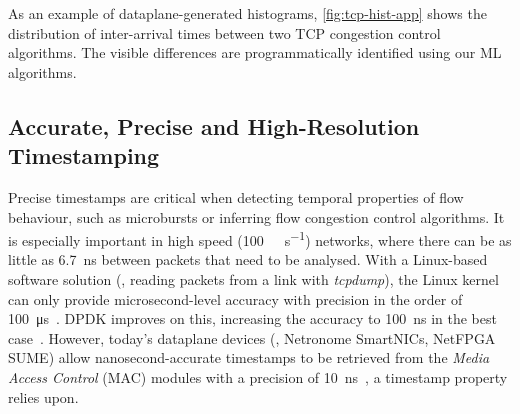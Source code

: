 As an example of dataplane-generated histograms, \cref{fig:tcp-hist-app} shows the distribution of inter-arrival times between two TCP congestion control algorithms. The visible differences are programmatically identified using our ML algorithms.

\subsection{Accurate, Precise and High-Resolution Timestamping}

Precise timestamps are critical when detecting temporal properties of flow behaviour, such as microbursts or inferring flow congestion control algorithms.
It is especially important in high speed (\SI{100}{\giga\bit\per\second}) networks, where there can be as little as \SI{6.7}{\nano\second} between packets that need to be analysed.
With a Linux-based software solution (\eg, reading packets from a link with \emph{tcpdump}), the Linux kernel can only provide microsecond-level accuracy with precision in the order of \SI{100}{\micro\second}~\parencite{DBLP:conf/noms/KundelSBRK20}.
DPDK improves on this, increasing the accuracy to \SI{100}{\nano\second} in the best case~\parencite{DBLP:journals/ccr/PrimoracBA17}.
However, today's dataplane devices (\eg, Netronome SmartNICs, NetFPGA SUME) allow nanosecond-accurate timestamps to be retrieved from the \emph{Media Access Control} (MAC) modules with a precision of \SI{10}{\nano\second}~\parencite{DBLP:conf/noms/KundelSBRK20}, a timestamp property \seidr{} relies upon.


